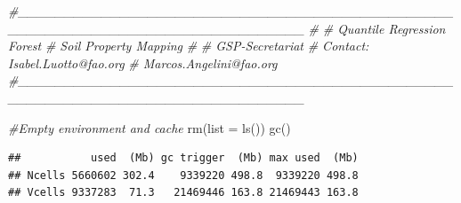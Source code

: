 \documentclass[
  10pt,
  b5paper,
  oneside]{book}
\newenvironment{Shaded}{\begin{snugshade}}{\end{snugshade}}
\newcommand{\AttributeTok}[1]{\textcolor[rgb]{0.77,0.63,0.00}{#1}}
\newcommand{\CommentTok}[1]{\textcolor[rgb]{0.56,0.35,0.01}{\textit{#1}}}
\newcommand{\FunctionTok}[1]{\textcolor[rgb]{0.00,0.00,0.00}{#1}}
\newcommand{\NormalTok}[1]{#1}
\begin{document}
\begin{Shaded}
\begin{Highlighting}[]
\CommentTok{\#\_\_\_\_\_\_\_\_\_\_\_\_\_\_\_\_\_\_\_\_\_\_\_\_\_\_\_\_\_\_\_\_\_\_\_\_\_\_\_\_\_\_\_\_\_\_\_\_\_\_\_\_\_\_\_\_\_\_\_\_\_\_\_\_\_\_\_\_\_\_\_\_\_\_\_\_\_\_\_}
\CommentTok{\#}
\CommentTok{\# Quantile Regression Forest}
\CommentTok{\# Soil Property Mapping}
\CommentTok{\#}
\CommentTok{\# GSP{-}Secretariat}
\CommentTok{\# Contact: Isabel.Luotto@fao.org}
\CommentTok{\#          Marcos.Angelini@fao.org}
\CommentTok{\#\_\_\_\_\_\_\_\_\_\_\_\_\_\_\_\_\_\_\_\_\_\_\_\_\_\_\_\_\_\_\_\_\_\_\_\_\_\_\_\_\_\_\_\_\_\_\_\_\_\_\_\_\_\_\_\_\_\_\_\_\_\_\_\_\_\_\_\_\_\_\_\_\_\_\_\_\_\_\_}

\CommentTok{\#Empty environment and cache }
\FunctionTok{rm}\NormalTok{(}\AttributeTok{list =} \FunctionTok{ls}\NormalTok{())}
\FunctionTok{gc}\NormalTok{()}
\end{Highlighting}
\end{Shaded}

\begin{verbatim}
##           used  (Mb) gc trigger  (Mb) max used  (Mb)
## Ncells 5660602 302.4    9339220 498.8  9339220 498.8
## Vcells 9337283  71.3   21469446 163.8 21469443 163.8
\end{verbatim}
\end{document}
